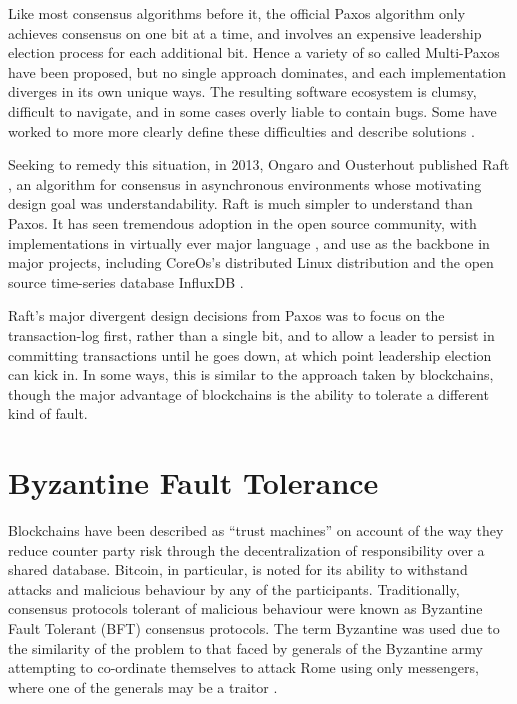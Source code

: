 Like most consensus algorithms before it, the official Paxos algorithm only achieves consensus on one bit at a time,
and involves an expensive leadership election process for each additional bit. 
Hence a variety of so called Multi-Paxos have been proposed, but no single approach dominates, 
and each implementation diverges in its own unique ways. 
The resulting software ecosystem is clumsy, difficult to navigate, and in some cases overly liable to contain bugs.
Some have worked to more more clearly define these difficulties 
and describe solutions \cite{chandra2007paxos}.

Seeking to remedy this situation, in 2013, Ongaro and Ousterhout published Raft \cite{raft},
an algorithm for consensus in asynchronous environments whose motivating design goal was understandability.
Raft is much simpler to understand than Paxos.
It has seen tremendous adoption in the open source community, 
with implementations in virtually ever major language \cite{raft.github.io},
and use as the backbone in major projects, 
including CoreOs's distributed Linux distribution \cite{coreos_raft} and the open source time-series database InfluxDB \cite{influxdb,hashicorp_raft}.

Raft's major divergent design decisions from Paxos was to focus on the transaction-log first, rather than a single bit,
and to allow a leader to persist in committing transactions until he goes down, 
at which point leadership election can kick in. 
In some ways, this is similar to the approach taken by blockchains, 
though the major advantage of blockchains is the ability to tolerate a different kind of fault.

\section{Byzantine Fault Tolerance}

Blockchains have been described as ``trust machines'' \cite{economist_blockchains} on account of the way they reduce counter party risk through the decentralization of responsibility over a shared database.
Bitcoin, in particular, is noted for its ability to withstand attacks and malicious behaviour by any of the participants. 
Traditionally, consensus protocols tolerant of malicious behaviour were known as Byzantine Fault Tolerant (BFT) consensus protocols.
The term Byzantine was used due to the similarity of the problem to that faced by generals of the Byzantine army attempting to co-ordinate themselves to attack Rome using only messengers,
where one of the generals may be a traitor \cite{lamport1982byzantine}.

